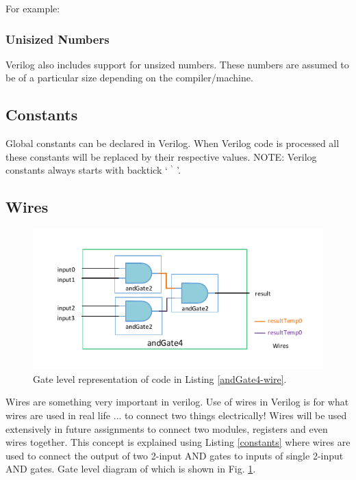 \documentclass[a4paper,10pt]{article}
\theoremstyle{mytheor}
\newcommand{
  \insertverilog}[3]{
  
}
\begin{document}
For example:
\insertverilog{./verilog_files/sizedNumbers.v}{sized-numbers}{\text{Example of sized numbers}}
 
\subsubsection*{Unisized Numbers}
Verilog also includes support for unsized numbers. These numbers are
assumed to be of a particular size depending on the
compiler/machine.

\subsection*{Constants}
Global constants can be declared in Verilog. When Verilog code is
processed all these constants will be replaced by their respective
values. NOTE: Verilog constants always starts with backtick `
${}^{\backprime}$ '.
\insertverilog{./verilog_files/constants.v}{constants}{\text{Declaration
    and use of constants}}

\subsection*{Wires}

\begin{figure}[!h] \centering  
  \includegraphics[width=\linewidth]{./resources/andGate4_representation.pdf}
  \caption{Gate level representation of code in Listing \ref{andGate4-wire}.} 
  \label{Fig:andGate4-representation}
\end{figure}

Wires are something very important in verilog. Use of wires in Verilog
is for what wires are used in real life ... to connect two things
electrically! Wires will be used extensively in future assignments to
connect two modules, registers and even wires together. This concept
is explained using Listing \ref{constants} where wires are used to
connect the output of two 2-input AND gates to inputs of single
2-input AND gates. Gate level diagram of which is shown in
Fig. \ref{Fig:andGate4-representation}.
\end{document}
